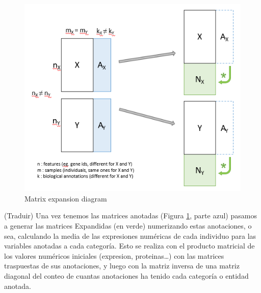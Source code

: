 \documentclass[a4paper, nobind]{templates/ociamthesis}
\begin{document}
\begin{figure}

{\centering \includegraphics[width=0.95\linewidth]{figures/chapter3/3-4_matrix_expansion_diagram} 

}

\caption{Matrix expansion diagram}\label{fig:fig3-4}
\end{figure}

(Traduir) Una vez tenemos las matrices anotadas (Figura \ref{fig:fig3-4}, parte azul) pasamos a generar las matrices Expandidas (en verde) numerizando estas anotaciones, o sea, calculando la media de las expresiones numéricas de cada individuo para las variables anotadas a cada categoría. Esto se realiza con el producto matricial de los valores numéricos iniciales (expresion, proteinas\ldots) con las matrices traspuestas de sus anotaciones, y luego con la matriz inversa de una matriz diagonal del conteo de cuantas anotaciones ha tenido cada categoría o entidad anotada.
\end{document}
